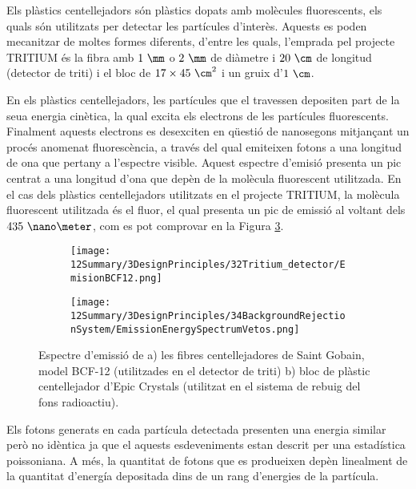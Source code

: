 Els plàstics centellejadors són plàstics dopats amb molècules fluorescents, els quals són utilitzats per detectar les partícules d'interès. Aquests es poden mecanitzar de moltes formes diferents, d'entre les quals, l'emprada pel projecte TRITIUM és la fibra amb $1~\mm$ o $2~\mm$ de diàmetre i $20~\cm$ de longitud (detector de triti) i el bloc de $17\times 45~\cm^2$ i un gruix d'$1~\cm$. 

En els plàstics centellejadors, les partícules que el travessen depositen part de la seua energia cinètica, la qual excita els electrons de les partícules fluorescents. Finalment aquests electrons es desexciten en qüestió de nanosegons mitjançant un procés anomenat fluorescència, a través del qual emiteixen fotons a una longitud de ona que pertany a l'espectre visible. Aquest espectre d'emisió presenta un pic centrat a una longitud d'ona que depèn de la molècula fluorescent utilitzada. En el cas dels plàstics centellejadors utilitzats en el projecte TRITIUM, la molècula fluorescent utilitzada és el fluor, el qual presenta un pic de emissió al voltant dels $435~\nano\meter$, com es pot comprovar en la Figura \ref{fig:EspectreEmisioPlasticsTRITIUM}.

\begin{figure}
\centering
    \begin{subfigure}[b]{0.7\textwidth}
    \centering
    \texttt{[image: 12Summary/3DesignPrinciples/32Tritium\_detector/EmisionBCF12.png]}  
        \caption{}\label{subfig:EspectreEmisioFibres}
    \end{subfigure}
    \hfill
    \begin{subfigure}[b]{0.7\textwidth}
    \centering
    \texttt{[image: 12Summary/3DesignPrinciples/34BackgroundRejectionSystem/EmissionEnergySpectrumVetos.png]}  
    \caption{\label{subfig:EspectreEmisioVeto}}
    \end{subfigure}
\caption{Espectre d'emissió de a) les fibres centellejadores de Saint Gobain, model BCF-12 (utilitzades en el detector de triti) \cite{DataSheetBCF12Fiber} b) bloc de plàstic centellejador d'Epic Crystals (utilitzat en el sistema de rebuig del fons radioactiu)\cite{ScintillatorVeto}\label{fig:EspectreEmisioPlasticsTRITIUM}.}
\end{figure}

Els fotons generats en cada partícula detectada presenten una energia similar però no idèntica ja que el aquests esdeveniments estan descrit per una estadística poissoniana. A més, la quantitat de fotons que es produeixen depèn linealment de la quantitat d'energía depositada dins de un rang d'energies de la partícula.

